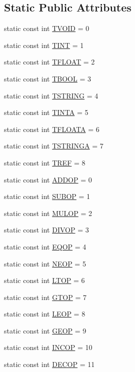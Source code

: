 \subsection*{Static Public Attributes}
\begin{DoxyCompactItemize}
\item 
static const int \hyperlink{classAstNode_ac664e0864b9c856e947d5fde632eb5e7}{TVOID} = 0
\item 
static const int \hyperlink{classAstNode_a8568313f5d280773a446280c94d382f8}{TINT} = 1
\item 
static const int \hyperlink{classAstNode_abf470f775bd7a7bfc2c0610716054339}{TFLOAT} = 2
\item 
static const int \hyperlink{classAstNode_a71904f4c33eff3bb3a37fadda88f12c9}{TBOOL} = 3
\item 
static const int \hyperlink{classAstNode_a2245a2aec841592ecddf8f9497306a4b}{TSTRING} = 4
\item 
static const int \hyperlink{classAstNode_a7233043e1a9d95c3120a62ac66c89608}{TINTA} = 5
\item 
static const int \hyperlink{classAstNode_a9d01a6ac8a4a7a5b2d4a3ec8a7e93fa7}{TFLOATA} = 6
\item 
static const int \hyperlink{classAstNode_ae3a9310b89b8c86afe245cf88ab1369a}{TSTRINGA} = 7
\item 
static const int \hyperlink{classAstNode_ad84a595b7727d93d325664d5bf89c766}{TREF} = 8
\item 
static const int \hyperlink{classAstNode_af908b13b6954116a438f86ce595d5bfe}{ADDOP} = 0
\item 
static const int \hyperlink{classAstNode_a8d62c361a16d84b762172fac68650561}{SUBOP} = 1
\item 
static const int \hyperlink{classAstNode_af1564bffc1a770122ea56654f4439531}{MULOP} = 2
\item 
static const int \hyperlink{classAstNode_a3972892cd58f1c70c84366804bdfd371}{DIVOP} = 3
\item 
static const int \hyperlink{classAstNode_a9cb6a842a496aed85756aa779789ce77}{EQOP} = 4
\item 
static const int \hyperlink{classAstNode_a3347eacf3e38675c075a7ce1c4cb6e29}{NEOP} = 5
\item 
static const int \hyperlink{classAstNode_a1ddf9dbcce4b80d311e7080b8262b65b}{LTOP} = 6
\item 
static const int \hyperlink{classAstNode_a3103a273c9da38b092334c757ee19ace}{GTOP} = 7
\item 
static const int \hyperlink{classAstNode_ac62da8b0313271a74293826f586dd6ea}{LEOP} = 8
\item 
static const int \hyperlink{classAstNode_aeb92e9f6e1407ff0c945f220b3da9820}{GEOP} = 9
\item 
static const int \hyperlink{classAstNode_abf9092d925819312d2547c414b493c4f}{INCOP} = 10
\item 
static const int \hyperlink{classAstNode_a0a48e47b23689fb51c059cb48a007adc}{DECOP} = 11
\end{DoxyCompactItemize}


